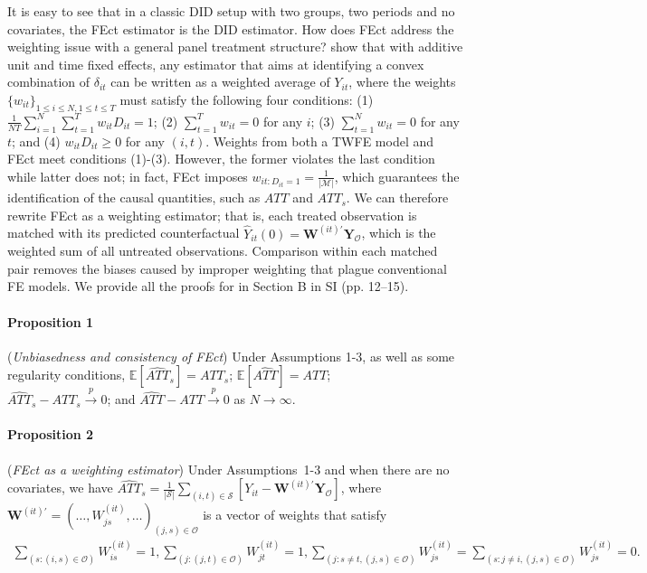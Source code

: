 \documentclass[12pt]{article}
\let\oldcenter\center
\let\oldendcenter\endcenter
\renewenvironment{center}{\setlength\topsep{0pt}\oldcenter}{\oldendcenter}
\newcommand{\E}{\mathbb{E}}
\begin{document}
It is easy to see that in a classic DID setup with two groups, two periods and no covariates, the FEct estimator is the DID estimator. How does FEct address the weighting issue with a general panel treatment structure? \citet{arkhangelsky2021double} show that with additive unit and time fixed effects, any estimator that aims at identifying a convex combination of $\delta_{it}$ can be written as a weighted average of $Y_{it}$, where the weights $\{w_{it}\}_{1\leq i \leq N, 1 \leq t \leq T}$ must satisfy the following four conditions: (1) $\frac{1}{NT}\sum_{i=1}^N \sum_{t=1}^T w_{it}D_{it}= 1$; (2) $\sum_{t=1}^T w_{it} = 0$ for any $i$; (3) $\sum_{t=1}^N w_{it} = 0$ for any $t$; and (4) $w_{it}D_{it} \geq 0$ for any $(i, t)$. Weights from both a TWFE model and FEct meet conditions (1)-(3). However, the former violates the last condition while latter does not; in fact, FEct imposes $w_{it: D_{it}=1} = \frac{1}{|\mathcal{M}|}$, which guarantees the identification of the causal quantities, such as $ATT$ and $ATT_{s}$. We can therefore rewrite FEct as a weighting estimator; that is, each treated observation is matched with its predicted counterfactual $\hat{Y}_{it}(0) = \mathbf{W}^{(it)'} \mathbf{Y}_{\mathcal{O}}$, which is the weighted sum of all untreated observations. Comparison within each matched pair removes the biases caused by improper weighting that plague conventional FE models. We provide all the proofs for in Section B in SI (pp. 12--15). 

\paragraph{Proposition 1} ({\it Unbiasedness and consistency of FEct}) Under Assumptions 1-3, as well as some regularity conditions,
\begin{center}
    $\E[\widehat{ATT}_{s}] = ATT_{s}$; $\E[\widehat{ATT}] = ATT$;\\
    $\widehat{ATT}_{s} - ATT_{s} \overset{p}{\to} 0$; and $\widehat{ATT} -  ATT \overset{p}{\to} 0$ as $N\to\infty$.
\end{center}\vspace{-1ex}
\paragraph{Proposition 2} ({\it FEct as a weighting estimator}) Under Assumptions~1-3 and when there are no covariates, we have 
   \begin{center}
    $\widehat{ATT}_{s} = \frac{1}{|\mathcal{S}|}
                        \sum_{(i,t) \in \mathcal{S}} [Y_{it} - \mathbf{W}^{(it)'} \mathbf{Y}_{\mathcal{O}}]$,
  \end{center} 
  where $\mathbf{W}^{(it)'} = \left(\dots, W_{js}^{(it)}, \dots\right)_{(j,s) \in \mathcal{O}}$ is a vector of weights that satisfy
  \begin{align*}
  \sum_{(s: (i, s)\in\mathcal{O})}W_{is}^{(it)} = 1, \sum_{(j: (j, t)\in\mathcal{O})}W_{jt}^{(it)} = 1, \sum_{(j: s \neq t, (j, s)\in\mathcal{O})}W_{js}^{(it)} = \sum_{(s: j \neq i, (j, s)\in\mathcal{O})}W_{js}^{(it)} = 0.
  \end{align*}
\end{document}
